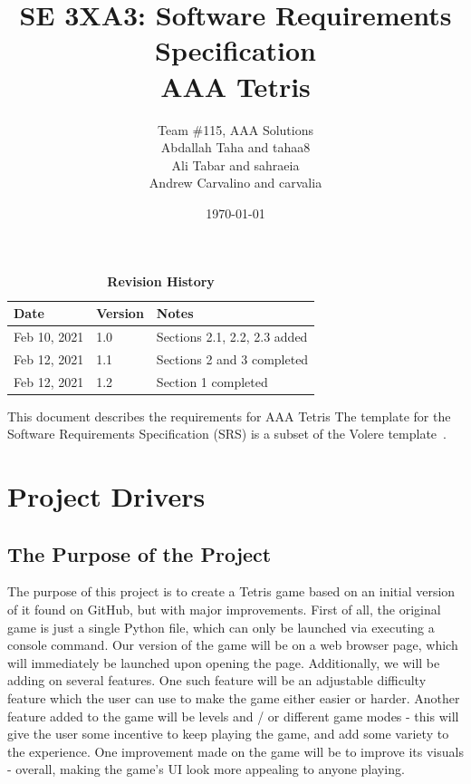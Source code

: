 \documentclass[12pt, titlepage]{article}
\title{SE 3XA3: Software Requirements Specification\\AAA Tetris}
\author{Team \#115, AAA Solutions
		\\ Abdallah Taha and tahaa8
		\\ Ali Tabar and sahraeia
		\\ Andrew Carvalino and carvalia
}
\date{\today}
\begin{document}
\maketitle

\tableofcontents
\listoftables
\listoffigures

\begin{table}[bp]
\caption{\bf Revision History}
\begin{tabularx}{\textwidth}{p{3cm}p{2cm}X}
\toprule {\bf Date} & {\bf Version} & {\bf Notes}\\
\midrule
Feb 10, 2021 & 1.0 & Sections 2.1, 2.2, 2.3 added\\
Feb 12, 2021 & 1.1 & Sections 2 and 3 completed\\
Feb 12, 2021 & 1.2 & Section 1 completed\\
\bottomrule
\end{tabularx}
\end{table}

\newpage


This document describes the requirements for AAA Tetris The template for the Software
Requirements Specification (SRS) is a subset of the Volere
template~\citep{RobertsonAndRobertson2012}.

\section{Project Drivers}

\subsection{The Purpose of the Project}
The purpose of this project is to create a Tetris game based on an initial version of it found on GitHub, but with major improvements. First of all, the original game is just a single Python file, which can only be launched via executing a console command. Our version of the game will be on a web browser page, which will immediately be launched upon opening the page. Additionally, we will be adding on several features. One such feature will be an adjustable difficulty feature which the user can use to make the game either easier or harder. Another feature added to the game will be levels and / or different game modes - this will give the user some incentive to keep playing the game, and add some variety to the experience. 
One improvement made on the game will be to improve its visuals - overall, making the game’s UI look more appealing to anyone playing.
\end{document}
